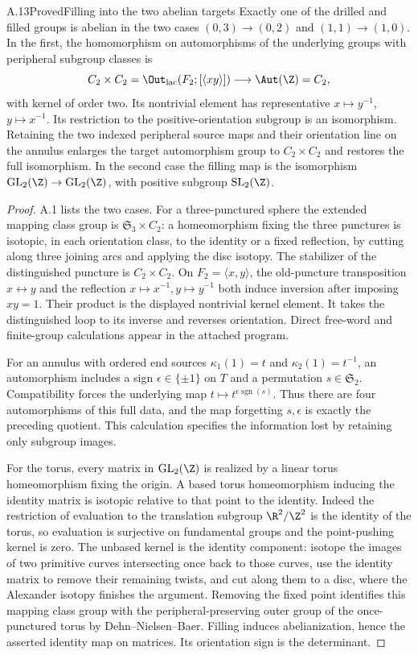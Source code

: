\begin{claim}{A.13}{Proved}{Filling into the two abelian targets}
Exactly one of the drilled and filled groups is abelian in the two cases $(0,3)\to(0,2)$ and $(1,1)\to(1,0)$. In the first, the homomorphism on automorphisms of the underlying groups with peripheral subgroup classes is
\[
 C_2\times C_2=\Out_{\mathrm{lac}}(F_2;[\langle xy\rangle])
 \longrightarrow\Aut(\Z)=C_2,
\]
with kernel of order two. Its nontrivial element has representative $x\mapsto y^{-1}$, $y\mapsto x^{-1}$. Its restriction to the positive-orientation subgroup is an isomorphism. Retaining the two indexed peripheral source maps and their orientation line on the annulus enlarges the target automorphism group to $C_2\times C_2$ and restores the full isomorphism. In the second case the filling map is the isomorphism $\operatorname{GL}_2(\Z)\to\operatorname{GL}_2(\Z)$, with positive subgroup $\operatorname{SL}_2(\Z)$.
\end{claim}
\begin{proof}
A.1 lists the two cases. For a three-punctured sphere the extended mapping class group is $\mathfrak S_3\times C_2$: a homeomorphism fixing the three punctures is isotopic, in each orientation class, to the identity or a fixed reflection, by cutting along three joining arcs and applying the disc isotopy. The stabilizer of the distinguished puncture is $C_2\times C_2$. On $F_2=\langle x,y\rangle$, the old-puncture transposition $x\leftrightarrow y$ and the reflection $x\mapsto x^{-1},y\mapsto y^{-1}$ both induce inversion after imposing $xy=1$. Their product is the displayed nontrivial kernel element. It takes the distinguished loop to its inverse and reverses orientation. Direct free-word and finite-group calculations appear in the attached program.

For an annulus with ordered end sources $\kappa_1(1)=t$ and $\kappa_2(1)=t^{-1}$, an automorphism includes a sign $\epsilon\in\{\pm1\}$ on $T$ and a permutation $s\in\mathfrak S_2$. Compatibility forces the underlying map $t\mapsto t^{\epsilon\operatorname{sgn}(s)}$. Thus there are four automorphisms of this full data, and the map forgetting $s,\epsilon$ is exactly the preceding quotient. This calculation specifies the information lost by retaining only subgroup images.

For the torus, every matrix in $\operatorname{GL}_2(\Z)$ is realized by a linear torus homeomorphism fixing the origin. A based torus homeomorphism inducing the identity matrix is isotopic relative to that point to the identity. Indeed the restriction of evaluation to the translation subgroup $\R^2/\Z^2$ is the identity of the torus, so evaluation is surjective on fundamental groups and the point-pushing kernel is zero. The unbased kernel is the identity component: isotope the images of two primitive curves intersecting once back to those curves, use the identity matrix to remove their remaining twists, and cut along them to a disc, where the Alexander isotopy finishes the argument. Removing the fixed point identifies this mapping class group with the peripheral-preserving outer group of the once-punctured torus by Dehn--Nielsen--Baer. Filling induces abelianization, hence the asserted identity map on matrices. Its orientation sign is the determinant.
\end{proof}
